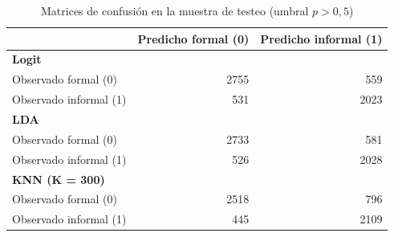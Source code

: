 \begin{table}[H]
\caption{Matrices de confusión en la muestra de testeo (umbral $p>0,5$)}
\label{tab:matriz_confusion}
\centering
\footnotesize
\begin{tabular}{lrr}
\toprule
 & Predicho formal (0) & Predicho informal (1) \\
\midrule
\multicolumn{3}{l}{\textbf{Logit}} \\
Observado formal (0) & 2755 & 559 \\
Observado informal (1) & 531 & 2023 \\
\midrule
\multicolumn{3}{l}{\textbf{LDA}} \\
Observado formal (0) & 2733 & 581 \\
Observado informal (1) & 526 & 2028 \\
\midrule
\multicolumn{3}{l}{\textbf{KNN (K = 300)}} \\
Observado formal (0) & 2518 & 796 \\
Observado informal (1) & 445 & 2109 \\
\bottomrule
\end{tabular}
\end{table}
